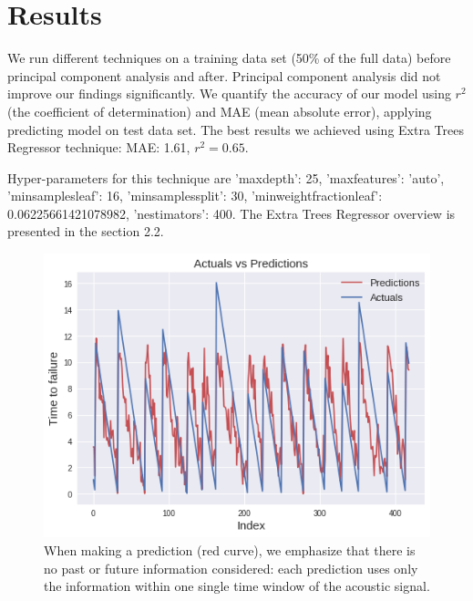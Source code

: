 \documentclass[]{llncs} %
\begin{document}
\section{Results}
We run different techniques on a training data set (50\% of the full data) before principal component analysis and after. Principal component analysis did not improve our findings significantly. We quantify the accuracy of our model using $r^2$ (the coefficient of determination) and MAE (mean absolute error), applying predicting model on test data set. The best results we achieved using  Extra Trees Regressor technique: MAE: 1.61, $r^2 = 0.65$. \par

Hyper-parameters for this technique are 'maxdepth': 25,  'maxfeatures': 'auto', 'minsamplesleaf': 16,  'minsamplessplit': 30, 'minweightfractionleaf': 0.06225661421078982,  'nestimators': 400. The Extra Trees Regressor overview is presented in the section 2.2.

\begin{figure}
	\centering
	\includegraphics[width=.9\linewidth]{results1}
	\caption{When making a prediction (red curve), we emphasize that there is no past or future information considered: each prediction uses only the information within one single time window of the acoustic signal.}
	\label{fig:results1}
\end{figure}
\end{document}
